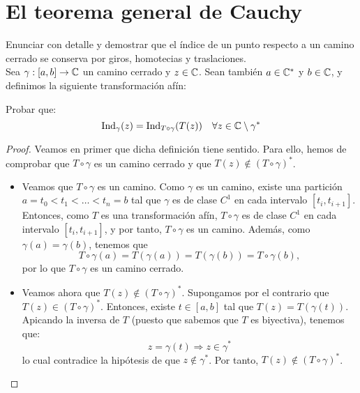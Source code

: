 \section{El teorema general de Cauchy}

\begin{ejercicio}
    Enunciar con detalle y demostrar que el índice de un punto respecto a un camino cerrado se conserva por giros, homotecias y traslaciones.\\

    Sea $\gamma : [a,b] \to \mathbb{C}$ un camino cerrado y $z \in \mathbb{C}$. Sean también $a\in \mathbb{C}^*$ y $b\in \mathbb{C}$, y definimos la siguiente transformación afín:

    Probar que:
    \begin{equation*}
        \operatorname{Ind}_{\gamma}(z) = \operatorname{Ind}_{T\circ\gamma}(T(z)) \quad \forall z \in \mathbb{C}\setminus \gamma^*
    \end{equation*}
    \begin{proof}
        Veamos en primer que dicha definición tiene sentido. Para ello, hemos de comprobar que $T\circ\gamma$ es un camino cerrado y que $T(z) \notin (T\circ\gamma)^*$. 
        \begin{itemize}
            \item Veamos que $T\circ\gamma$ es un camino. Como $\gamma$ es un camino, existe una partición $a = t_0 < t_1 < \ldots < t_n = b$ tal que $\gamma$ es de clase $C^1$ en cada intervalo $[t_i,t_{i+1}]$. Entonces, como $T$ es una transformación afín, $T\circ\gamma$ es de clase $C^1$ en cada intervalo $[t_i,t_{i+1}]$, y por tanto, $T\circ\gamma$ es un camino. Además, como $\gamma(a) = \gamma(b)$, tenemos que
            \begin{equation*}
                T\circ\gamma(a) = T(\gamma(a)) = T(\gamma(b)) = T\circ\gamma(b),
            \end{equation*}
            por lo que $T\circ\gamma$ es un camino cerrado.


            \item Veamos ahora que $T(z) \notin (T\circ\gamma)^*$. Supongamos por el contrario que $T(z) \in (T\circ\gamma)^*$. Entonces, existe $t \in [a,b]$ tal que $T(z) = T(\gamma(t))$. Apicando la inversa de $T$ (puesto que sabemos que $T$ es biyectiva), tenemos que:
            \begin{equation*}
                z = \gamma(t)\Longrightarrow z \in \gamma^*
            \end{equation*}
            lo cual contradice la hipótesis de que $z \notin \gamma^*$. Por tanto, $T(z) \notin (T\circ\gamma)^*$.
        \end{itemize}


\end{proof}
\end{ejercicio}
